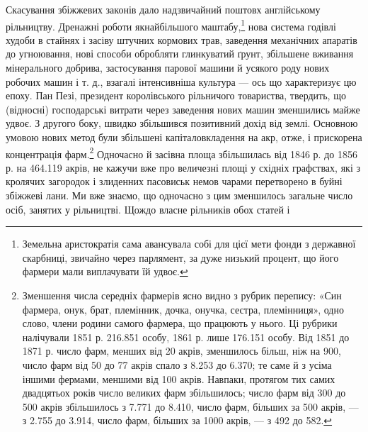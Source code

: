 Скасування збіжжевих законів дало надзвичайний поштовх
англійському рільництву. Дренажні роботи якнайбільшого маштабу,\footnote{
Земельна аристократія сама авансувала собі для цієї мети фонди
з державної скарбниці, звичайно через парлямент, за дуже низький
процент, що його фармери мали виплачувати їй удвоє.
}
нова система годівлі худоби в стайнях і засіву штучних
кормових трав, заведення механічних апаратів до угноювання,
нові способи обробляти глинкуватий ґрунт, збільшене вживання
мінерального добрива, застосування парової машини й
усякого роду нових робочих машин і т. д., взагалі інтенсивніша
культура — ось що характеризує цю епоху. Пан Пезі, президент
королівського рільничого товариства, твердить, що (відносні)
господарські витрати через заведення нових машин зменшились
майже удвоє. З другого боку, швидко збільшився позитивний
дохід від землі. Основною умовою нових метод були збільшені
капіталовкладення на акр, отже, і прискорена концентрація
фарм.\footnote{
Зменшення числа середніх фармерів ясно видно з рубрик перепису:
«Син фармера, онук, брат, племінник, дочка, онучка, сестра, племінниця»,
одно слово, члени родини самого фармера, що працюють у
нього. Ці рубрики налічували 1851 р. \num{216.851} особу, 1861 р. лише \num{176.151}
особу. Від 1851 до 1871 р. число фарм, менших від 20 акрів, зменшилось
більш, ніж на 900, число фарм від 50 до 77 акрів спало з \num{8.253} до \num{6.370};
те саме й з усіма іншими фермами, меншими від 100 акрів. Навпаки,
протягом тих самих двадцятьох років число великих фарм збільшилось;
число фарм від 300 до 500 акрів збільшилось з \num{7.771} до \num{8.410}, число
фарм, більших за 500 акрів, — з \num{2.755} до \num{3.914}, число фарм, більших
за 1000 акрів, — з 492 до 582.
} Одночасно й засівна площа збільшилась від 1846 р.
до 1856 р. на \num{464.119} акрів, не кажучи вже про величезні площі
у східніх графствах, які з кролячих загородок і злиденних пасовиськ
немов чарами перетворено в буйні збіжжеві лани. Ми вже
знаємо, що одночасно з цим зменшилось загальне число осіб,
занятих у рільництві. Щождо власне рільників обох статей і
\parbreak{}  %
